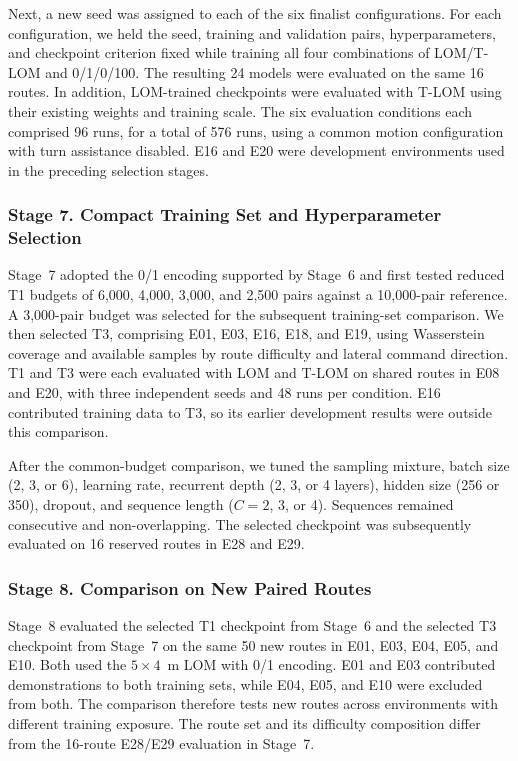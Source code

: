 \documentclass[robotics,article,submit,pdftex,moreauthors]{Definitions/mdpi}
\begin{document}
Next, a new seed was assigned to each of the six finalist configurations. For each configuration, we held the seed, training and validation pairs, hyperparameters, and checkpoint criterion fixed while training all four combinations of LOM/T-LOM and 0/1/0/100. The resulting 24 models were evaluated on the same 16 routes. In addition, LOM-trained checkpoints were evaluated with T-LOM using their existing weights and training scale. The six evaluation conditions each comprised 96 runs, for a total of 576 runs, using a common motion configuration with turn assistance disabled. E16 and E20 were development environments used in the preceding selection stages.

\subsubsection{Stage 7. Compact Training Set and Hyperparameter Selection}\label{subsec:stage7_setup}

Stage~7 adopted the 0/1 encoding supported by Stage~6 and first tested reduced T1 budgets of 6,000, 4,000, 3,000, and 2,500 pairs against a 10,000-pair reference. A 3,000-pair budget was selected for the subsequent training-set comparison. We then selected T3, comprising E01, E03, E16, E18, and E19, using Wasserstein coverage and available samples by route difficulty and lateral command direction. T1 and T3 were each evaluated with LOM and T-LOM on shared routes in E08 and E20, with three independent seeds and 48 runs per condition. E16 contributed training data to T3, so its earlier development results were outside this comparison.

After the common-budget comparison, we tuned the sampling mixture, batch size (2, 3, or 6), learning rate, recurrent depth (2, 3, or 4 layers), hidden size (256 or 350), dropout, and sequence length ($C=2$, 3, or 4). Sequences remained consecutive and non-overlapping. The selected checkpoint was subsequently evaluated on 16 reserved routes in E28 and E29.

\subsubsection{Stage 8. Comparison on New Paired Routes}\label{subsec:stage8_setup}

Stage~8 evaluated the selected T1 checkpoint from Stage~6 and the selected T3 checkpoint from Stage~7 on the same 50 new routes in E01, E03, E04, E05, and E10. Both used the $5\times4$~m LOM with 0/1 encoding. E01 and E03 contributed demonstrations to both training sets, while E04, E05, and E10 were excluded from both. The comparison therefore tests new routes across environments with different training exposure. The route set and its difficulty composition differ from the 16-route E28/E29 evaluation in Stage~7.
\endgroup
\end{document}
